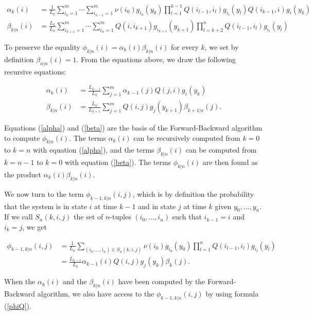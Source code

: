 \documentclass[12pt]{article}
\begin{document}
\begin{appendices}
    \begin{align*}
      \alpha_k(i) &= \frac{1}{L_k}
      \sum_{i_0=1}^m \cdots \sum_{i_{k-1}=1}^m
      \nu(i_0)g_{i_0}(y_0) \prod_{l=1}^{k-1} Q(i_{l-1},i_l) g_{i_l}(y_l)
      Q(i_{k-1}, i)g_i(y_k) \\
      \beta_{k|n}(i) &= \frac{L_k}{L_n}
      \sum_{i_{k+1}=1}^m \cdots \sum_{i_n=1}^m
      Q(i, i_{k+1})g_{i_{k+1}}(y_{k+1})
      \prod_{l=k+2}^n Q(i_{l-1}, i_l)g_{i_l}(y_l)
    \end{align*}

    To preserve the equality $\phi_{k|n}(i) = \alpha_k(i)\beta_{k|n}(i)$
    for every $k$, we set by definition $\beta_{n|n}(i) = 1$.
    From the equations above, we draw the following recursive
    equations:

    \begin{align} \alpha_k(i) &= \frac{L_{k-1}}{L_k}
      \sum_{j=1}^m \alpha_{k-1}(j) Q(j,i) g_i(y_k) \label{alpha} \\
      \beta_{k|n}(i) &= \frac{L_k}{L_{k+1}}
      \sum_{j=1}^m Q(i,j) g_j(y_{k+1})
      \beta_{k+1|n}(j). \label{beta}
    \end{align}

    Equations (\ref{alpha}) and (\ref{beta}) are the basis of the
    Forward-Backward algorithm to compute $\phi_{k|n}(i)$. The terms
    $\alpha_k(i)$ can be recursively computed from $k=0$ to $k=n$
    with equation (\ref{alpha}), and the terms $\beta_{k|n}(i)$
    can be computed from $k=n-1$ to $k=0$ with equation (\ref{beta}).
    The terms $\phi_{k|n}(i)$ are then found as the product
    $\alpha_k(i)\beta_{k|n}(i)$.

    We now turn to the term $\phi_{k-1,k|n}(i,j)$, which is by
    definition the probability that the system is in state $i$ at
    time $k-1$ and in state $j$ at time $k$ given $y_0, \ldots, y_n$.
    If we call $S_n(k,i,j)$
    the set of $n$-tuples $(i_0, \ldots, i_n)$ such that
    $i_{k-1} = i$ and $i_k = j$, we get

    \begin{align}
      \phi_{k-1,k|n}(i,j) &= \frac{1}{L_n}
       \sum_{(i_0, \ldots, i_n) \in S_n(k,i,j)}
       \nu(i_0)g_{i_0}(y_0) \prod_{l=1}^n Q(i_{l-1}, i_l)
       g_{i_l}(y_l) \nonumber \\
        &= \frac{L_{k-1}}{L_k}
       \alpha_{k-1}(i) Q(i,j) g_j(y_k) \beta_k(j). \label{phiQ}
    \end{align}

    When the $\alpha_k(i)$ and the $\beta_{k|n}(i)$ have been
    computed by the Forward-Backward algorithm, we also have access
    to the $\phi_{k-1,k|n}(i,j)$ by using formula (\ref{phiQ}).
    

\end{appendices}
\end{document}
